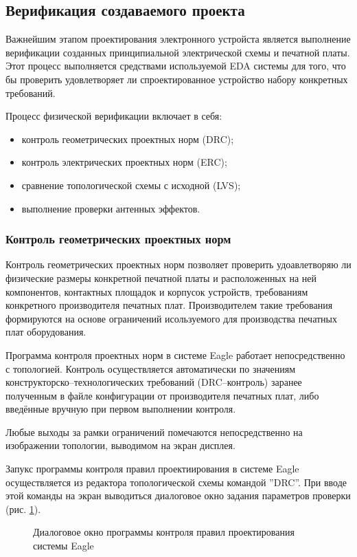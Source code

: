 \subsection{Верификация создаваемого проекта}
Важнейшим этапом проектирования электронного устройста является выполнение
верификации созданных принципиальной электрической схемы и печатной платы.
Этот процесс выполняется средствами используемой EDA системы
для того, что бы проверить удовлетворяет ли спроектированное устройство набору
конкретных требований.

Процесс физической верификации включает в себя:
\begin{itemize}
	\item{} контроль геометрических проектных норм (DRC);
	\item{} контроль электрических проектных норм (ERC);
	\item{} сравнение топологической схемы с исходной (LVS);
	\item{} выполнение проверки антенных эффектов.
\end{itemize}


\subsubsection{Контроль геометрических проектных норм}
Контроль геометрических проектных норм позволяет проверить удоавлетворяю ли физические
размеры конкретной печатной платы и расположенных на ней компонентов, контактных
площадок и корпусок устройств, требованиям конкретного производителя печатных плат.
Производителем такие требования формируются на основе ограничений исользуемого для
производства печатных плат оборудования.

Программа контроля проектных норм в системе Eagle работает непосредственно с топологией.
Контроль осуществляется автоматически по значениям конструкторско--технологических
требований (DRC--контроль) заранее полученным в файле конфигурации от производителя
печатных плат, либо введённые вручную при первом выполнении контроля.

Любые выходы за рамки ограничений помечаются непосредственно на изображении топологии,
выводимом на экран дисплея.

Запукс программы контроля правил проектиирования в системе Eagle осуществляется из
редактора топологической схемы командой ''DRC''.  При вводе этой команды на экран
выводиться диалоговое окно задания параметров проверки (рис. \ref{img:drc}).
\begin{figure}[h]
	\caption{Диалоговое окно программы контроля правил проектирования системы Eagle}
	\label{img:drc}
\end{figure}

